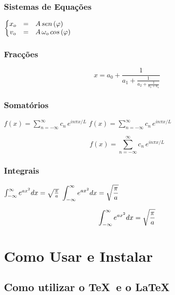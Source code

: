 \documentclass[a4paper,12pt]{article}
\begin{document}
\subsubsection{Sistemas de Equações}

\hskip 10mm$\left\{
\begin{matrix}
x_o & = & A\,sen\,(\varphi)           \hfill  \\
v_o & = & A\,\omega_o\,cos\,(\varphi) \hfill 
\end{matrix}
\right .$

\subsubsection{Fracções\cite{TUG:2003}}

\begin{equation}
\nonumber
  x = a_0 + \frac{1}{\displaystyle a_1
          + \frac{1}{\displaystyle a_2
          + \frac{1}{\displaystyle a_3 + a_4}}}
\end{equation}

\subsubsection{Somatórios}

\hskip 10mm
$f(x) = \sum_{n = - \infty}^{\infty} c_n\,e^{in\pi x/L}$
\hskip 20mm
$\displaystyle
f(x) = \sum_{n = - \infty}^{\infty} c_n\,e^{in\pi x/L}$

$$f(x) = \sum_{n = - \infty}^{\infty} c_n\,e^{in\pi x/L}$$

\subsubsection{Integrais}

\hskip 10mm
$\int_{-\infty}^{\infty} e^{ax^2} dx = \sqrt{\pi \over a}$
\hskip 30mm
$\displaystyle
\int_{-\infty}^{\infty} e^{ax^2} dx = \sqrt{\pi \over a}$

$$\int_{-\infty}^{\infty} e^{ax^2} dx = \sqrt{\pi \over a}$$

\break
\section{Como Usar e Instalar}

\subsection{Como utilizar o \TeX\ e o \LaTeX}
\end{document}
